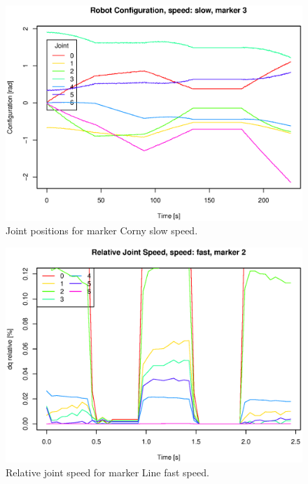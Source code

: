 \begin{figure}[H]\centering\includegraphics[width=\fullImageWidth]{graphics/rovi_robot_configuration_slow_marker3.eps}  \caption{Joint positions for marker Corny  slow speed.  }     \label{fig:rovi_joint_pos_S_Corny }   \end{figure}
\begin{figure}[H]\centering\includegraphics[width=\fullImageWidth]{graphics/rovi_robot_joint_speed_fast_marker2.eps}    \caption{Relative joint speed for marker Line   fast speed.  }\label{fig:rovi_joint_speed_F_Line  } \end{figure}
